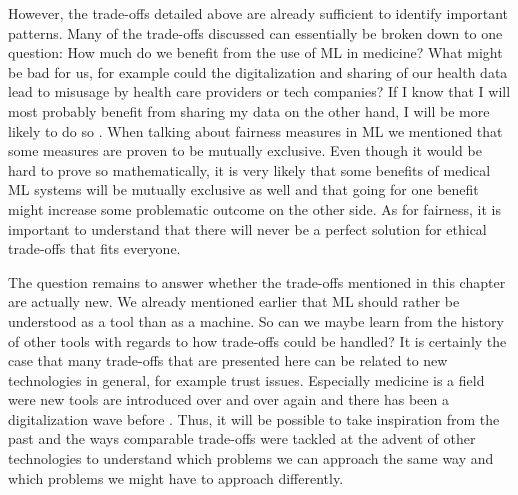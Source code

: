 However, the trade-offs detailed above are already sufficient to identify important patterns. Many of the trade-offs discussed can essentially be broken down to one question: How much do we benefit from the use of ML in medicine? What might be bad for us, for example could the digitalization and sharing of our health data lead to misusage by health care providers or tech companies? If I know that I will most probably benefit from sharing my data on the other hand, I will be more likely to do so \cite{topol2019high, he2019practical}. When talking about fairness measures in ML we mentioned that some measures are proven to be mutually exclusive. Even though it would be hard to prove so mathematically, it is very likely that some benefits of medical ML systems will be mutually exclusive as well and that going for one benefit might increase some problematic outcome on the other side. As for fairness, it is important to understand that there will never be a perfect solution for ethical trade-offs that fits everyone.

The question remains to answer whether the trade-offs mentioned in this chapter are actually new. We already mentioned earlier that ML should rather be understood as a tool than as a machine. So can we maybe learn from the history of other tools with regards to how trade-offs could be handled? It is certainly the case that many trade-offs that are presented here can be related to new technologies in general, for example trust issues. Especially medicine is a field were new tools are introduced over and over again and there has been a digitalization wave before \cite{sutton2020overview}. Thus, it will be possible to take inspiration from the past and the ways comparable trade-offs were tackled at the advent of other technologies to understand which problems we can approach the same way and which problems we might have to approach differently. 







